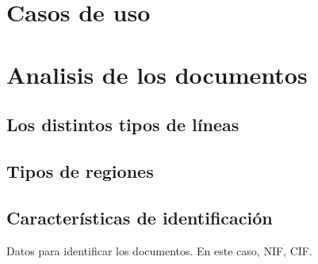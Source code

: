 \section{Casos de uso}

\section{Analisis de los documentos}

\subsection{Los distintos tipos de líneas}

\subsection{Tipos de regiones}

\subsection{Características de identificación}

Datos para identificar los documentos. En este caso, NIF, CIF.
